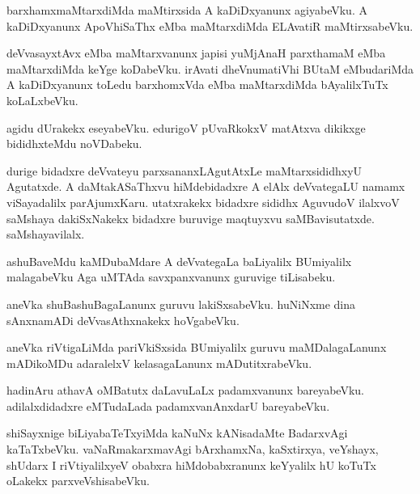 \begin{mng}
barxhamxmaMtarxdiMda maMtirxsida A kaDiDxyanunx agiyabeVku. A kaDiDxyanunx ApoVhiSaThx eMba maMtarxdiMda ELAvatiR maMtirxsabeVku.
\end{mng}

\begin{mng}
deVvasayxtAvx eMba maMtarxvanunx japisi yuMjAnaH parxthamaM eMba maMtarxdiMda keYge koDabeVku. irAvati dheVnumatiVhi BUtaM eMbudariMda A kaDiDxyanunx toLedu barxhomxVda eMba maMtarxdiMda bAyalilxTuTx koLaLxbeVku.
\end{mng}

\begin{mng}
agidu dUrakekx eseyabeVku. edurigoV pUvaRkokxV matAtxva dikikxge bididhxteMdu noVDabeku.
\end{mng}

\begin{mng}
durige bidadxre deVvateyu parxsananxLAgutAtxLe maMtarxsididhxyU Agutatxde. A daMtakASaThxvu hiMdebidadxre A elAlx deVvategaLU namamx viSayadalilx parAjumxKaru. utatxrakekx bidadxre sididhx AguvudoV ilalxvoV saMshaya dakiSxNakekx bidadxre buruvige maqtuyxvu saMBavisutatxde. saMshayavilalx.
\end{mng}

\begin{mng}
ashuBaveMdu kaMDubaMdare A deVvategaLa baLiyalilx BUmiyalilx malagabeVku Aga uMTAda savxpanxvanunx guruvige tiLisabeku.
\end{mng}

\begin{mng}
aneVka shuBashuBagaLanunx guruvu lakiSxsabeVku. huNiNxme dina sAnxnamADi deVvasAthxnakekx hoVgabeVku.
\end{mng}

\begin{mng}
aneVka riVtigaLiMda pariVkiSxsida BUmiyalilx guruvu maMDalagaLanunx mADikoMDu adaralelxV kelasagaLanunx mADutitxrabeVku.
\end{mng}

\begin{mng}
hadinAru athavA oMBatutx daLavuLaLx padamxvanunx bareyabeVku. adilalxdidadxre eMTudaLada padamxvanAnxdarU bareyabeVku.
\end{mng}

\begin{mng}
shiSayxnige biLiyabaTeTxyiMda kaNuNx kANisadaMte BadarxvAgi kaTaTxbeVku. vaNaRmakarxmavAgi bArxhamxNa, kaSxtirxya, veYshayx, shUdarx I riVtiyalilxyeV obabxra hiMdobabxranunx keYyalilx hU koTuTx oLakekx parxveVshisabeVku.
\end{mng}

